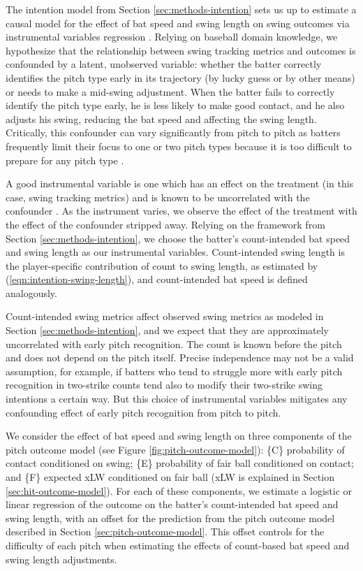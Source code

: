 \documentclass[
  12pt]{article}
\begin{document}
      The intention model from Section \ref{sec:methods-intention} sets us up to estimate a causal model for the effect of bat speed and swing length on swing outcomes via instrumental variables regression \citep{bollen_instrumental_2012}. Relying on baseball domain knowledge, we hypothesize that the relationship between swing tracking metrics and outcomes is confounded by a latent, unobserved variable: whether the batter correctly identifies the pitch type early in its trajectory (by lucky guess or by other means) or needs to make a mid-swing adjustment. When the batter fails to correctly identify the pitch type early, he is less likely to make good contact, and he also adjusts his swing, reducing the bat speed and affecting the swing length. Critically, this confounder can vary significantly from pitch to pitch as batters frequently limit their focus to one or two pitch types because it is too difficult to prepare for any pitch type \citep{gray_markov_2002}.

      A good instrumental variable is one which has an effect on the treatment (in this case, swing tracking metrics) and is known to be uncorrelated with the confounder \citep{bollen_instrumental_2012}. As the instrument varies, we observe the effect of the treatment with the effect of the confounder stripped away. Relying on the framework from Section \ref{sec:methods-intention}, we choose the batter's count-intended bat speed and swing length as our instrumental variables. Count-intended swing length is the player-specific contribution of count to swing length, as estimated by (\ref{eqn:intention-swing-length}), and count-intended bat speed is defined analogously.

      Count-intended swing metrics affect observed swing metrics as modeled in Section \ref{sec:methods-intention}, and we expect that they are approximately uncorrelated with early pitch recognition. The count is known before the pitch and does not depend on the pitch itself. Precise independence may not be a valid assumption, for example, if batters who tend to struggle more with early pitch recognition in two-strike counts tend also to modify their two-strike swing intentions a certain way. But this choice of instrumental variables mitigates any confounding effect of early pitch recognition from pitch to pitch.

      We consider the effect of bat speed and swing length on three components of the pitch outcome model (see Figure \ref{fig:pitch-outcome-model}): \{C\} probability of contact conditioned on swing; \{E\} probability of fair ball conditioned on contact; and \{F\} expected xLW conditioned on fair ball (xLW is explained in Section \ref{sec:hit-outcome-model}). For each of these components, we estimate a logistic or linear regression of the outcome on the batter's count-intended bat speed and swing length, with an offset for the prediction from the pitch outcome model described in Section \ref{sec:pitch-outcome-model}. This offset controls for the difficulty of each pitch when estimating the effects of count-based bat speed and swing length adjustments.
\end{document}
